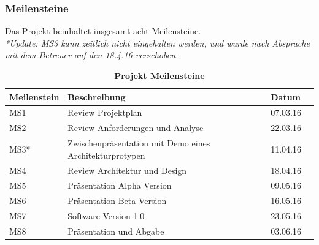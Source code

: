 \documentclass[a4,12pt]{scrartcl}
\begin{document}
\subsubsection{Meilensteine}
Das Projekt beinhaltet insgesamt acht Meilensteine. \\
\textit{*Update: MS3 kann zeitlich nicht eingehalten werden, und wurde nach Absprache mit dem Betreuer auf den 18.4.16 verschoben.}
\begin{table}[H]
    \begin{tabular}{@{} l l l r@{}}\toprule    
    {Meilenstein} & {Beschreibung} & {Datum}\\ \midrule
    MS1 & Review Projektplan & 07.03.16\\ \addlinespace
    MS2 & Review Anforderungen und Analyse  & 22.03.16\\ \addlinespace
    MS3* & Zwischenpräsentation mit Demo eines Architekturprotypen  & 11.04.16\\ \addlinespace
    MS4 & Review Architektur und Design & 18.04.16\\ \addlinespace
    MS5 & Präsentation Alpha Version   & 09.05.16\\ \addlinespace
    MS6 & Präsentation Beta Version  & 16.05.16\\ \addlinespace
    MS7 & Software Version 1.0  & 23.05.16\\ \addlinespace
    MS8 & Präsentation und Abgabe & 03.06.16\\ 
    \bottomrule
    \end{tabular}
\caption{\textbf{Projekt Meilensteine}}
\end{table}
\end{document}
